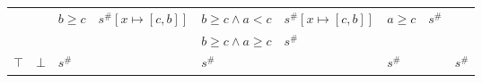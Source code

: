 \documentclass{beamer}
\begin{document}
\begin{frame}
\begin{table}
{\begin{tabular}{|l|l|ll|ll|ll|l|}
                                    &                         & \multirow{2}{*}{$b \ge c$} & \multirow{2}{*}{$s^\#[x \mapsto [c, b]]$} & $b \ge c \land a < c$   & $s^\#[x \mapsto [c, b]]$ & \multirow{2}{*}{$a \ge c$} & \multirow{2}{*}{$s^\#$}        &                                                 \\
                                    &                         &                            &                                           & $b \ge c \land a \ge c$ & $s^\#$                   &                            &                                &                                                 \\ \hline
    $\top$                          & $\bot$                  & \multicolumn{2}{l|}{$s^\#$}                                            & \multicolumn{2}{l|}{$s^\#$}                        & \multicolumn{2}{l|}{$s^\#$}                                 & $s^\#$                                          \\ \hline
    \end{tabular}}
    \end{table}
\end{frame}
\end{document}
